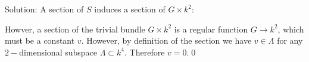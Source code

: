\begin{enumerate}
Solution: A section of $S$ induces a section of $G\times k^2$: 
\begin{center}
\end{center}
Howver, a section of the trivial bundle $G\times k^2$ is a regular function $G\to k^2$, which must be a constant $v$. 
However, by definition of the section we have $v\in \Lambda$ for any $2-$dimensional subspace $\Lambda\subset k^4$. 
Therefore $v=0$.\qed
\end{enumerate}
